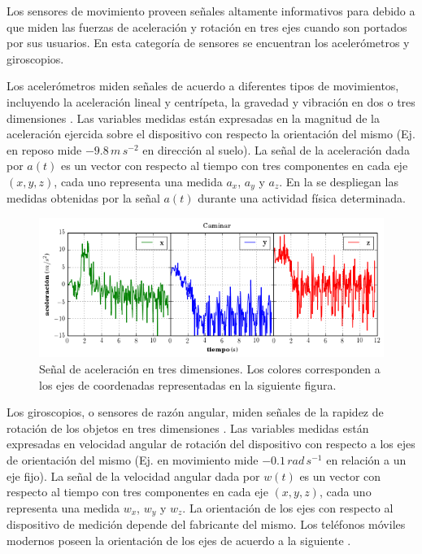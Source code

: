Los sensores de movimiento proveen señales altamente informativos
para  debido a que miden las fuerzas de aceleración y rotación
en tres ejes cuando son portados por sus usuarios. En esta categoría
de sensores se encuentran los acelerómetros y giroscopios. 

Los acelerómetros miden señales de acuerdo a diferentes tipos de movimientos,
incluyendo la aceleración lineal y centrípeta, la gravedad y vibración
en dos o tres dimensiones \cite{Goehl2007}. Las variables medidas
están expresadas en la magnitud de la aceleración ejercida sobre el
dispositivo con respecto la orientación del mismo (Ej. en reposo mide
$-9.8\,m\,s^{-2}$ en dirección al suelo). La señal de la aceleración
dada por $a(t)$ es un vector con respecto al tiempo con tres componentes
en cada eje $(x,y,z)$, cada uno representa una medida $a_{x}$, $a_{y}$
y $a_{z}$. En la  se despliegan las medidas
obtenidas por la señal $a(t)$ durante una actividad física determinada.

\begin{figure}[!tbph]
\begin{centering}
\includegraphics[width=1\columnwidth]{capitulo-4/graphics/signal_a3d}
\par\end{centering}
\caption[Señal de aceleración]{\label{fig4:muestra-ac}Señal de aceleración en tres dimensiones.
Los colores corresponden a los ejes de coordenadas representadas en
la siguiente figura.}
\end{figure}

Los giroscopios, o sensores de razón angular, miden señales de la
rapidez de rotación de los objetos en tres dimensiones \cite{Goehl2007}.
Las variables medidas están expresadas en velocidad angular de rotación
del dispositivo con respecto a los ejes de orientación del mismo (Ej.
en movimiento mide \foreignlanguage{english}{$-0.1\,rad\,s^{-1}$}
en relación a un eje fijo). La señal de la velocidad angular dada
por $w(t)$ es un vector con respecto al tiempo con tres componentes
en cada eje $(x,y,z)$, cada uno representa una medida $w_{x}$, $w_{y}$
y $w_{z}$. La orientación de los ejes con respecto al dispositivo
de medición depende del fabricante del mismo. Los teléfonos móviles
modernos poseen la orientación de los ejes de acuerdo a la siguiente
.

